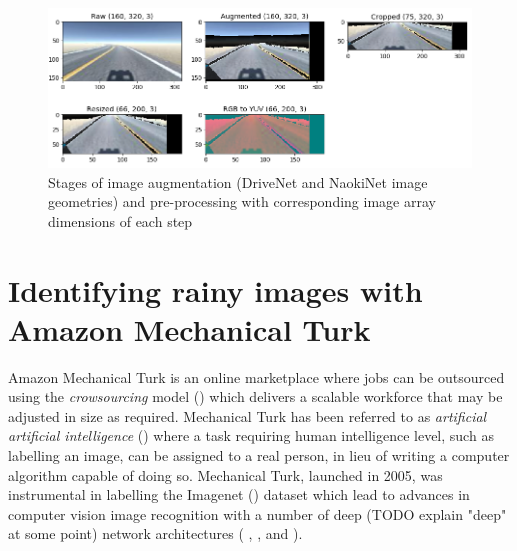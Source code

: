 \begin{figure}[ht]
 \centering 
 \includegraphics[width=\textwidth]{Figures/AugmentationPreProcessing.png}
 \caption{Stages of image augmentation (DriveNet and NaokiNet image geometries) and pre-processing with corresponding image array dimensions of each step}
 \label{fig:augpreproc}
\end{figure}







\section{Identifying rainy images with Amazon Mechanical Turk}

Amazon Mechanical Turk \cite{crowston2012amazon} is an online marketplace where jobs can be outsourced using the \textit{crowsourcing} model  (\cite{vukovic2009crowdsourcing}) which delivers a scalable workforce that may be adjusted in size as required. Mechanical Turk has been referred to as \textit{artificial artificial intelligence} (\cite{dai2011artificial}) where a task requiring human intelligence level, such as labelling an image, can be assigned to a real person, in lieu of writing  a computer algorithm capable of doing so. Mechanical Turk, launched in 2005, was instrumental in labelling the Imagenet (\cite{deng2009imagenet}) dataset which lead to advances in computer vision image recognition with a number of deep (TODO explain "deep" at some point) network architectures ( \cite{krizhevsky2012imagenet}, \cite{he2015deep}, \cite{szegedy2014going} and \cite{simonyan2015deep}). 

